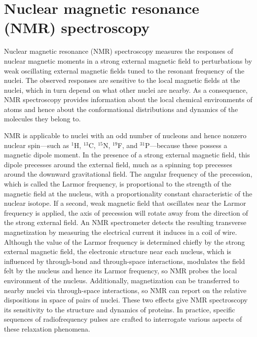 \documentclass[9pt,review,pubversion]{livecoms}
\begin{document}
\section{Nuclear magnetic resonance (NMR) spectroscopy}
\label{sec:nmr}

Nuclear magnetic resonance (NMR) spectroscopy measures the responses of nuclear magnetic moments in a strong external magnetic field to perturbations by weak oscillating external magnetic fields tuned to the resonant frequency of the nuclei.
The observed responses are sensitive to the local magnetic fields at the nuclei, which in turn depend on what other nuclei are nearby.
As a consequence, NMR spectroscopy provides information about the local chemical environments of atoms and hence about the conformational distributions and dynamics of the molecules they belong to.

NMR is applicable to nuclei with an odd number of nucleons and hence nonzero nuclear spin---such as $^1$H, $^{13}$C, $^{15}$N, $^{19}$F, and $^{31}$P---because these possess a magnetic dipole moment.
In the presence of a strong external magnetic field, this dipole precesses around the external field, much as a spinning top precesses around the downward gravitational field.
The angular frequency of the precession, which is called the Larmor frequency, is proportional to the strength of the magnetic field at the nucleus, with a proportionality constant characteristic of the nuclear isotope.
If a second, weak magnetic field that oscillates near the Larmor frequency is applied, the axis of precession will rotate away from the direction of the strong external field.
An NMR spectrometer detects the resulting transverse magnetization by measuring the electrical current it induces in a coil of wire.
Although the value of the Larmor frequency is determined chiefly by the strong external magnetic field, the electronic structure near each nucleus, which is influenced by through-bond and through-space interactions, modulates the field felt by the nucleus and hence its Larmor frequency, so NMR probes the local environment of the nucleus.
Additionally, magnetization can be transferred to nearby nuclei via through-space interactions, so NMR can report on the relative dispositions in space of pairs of nuclei.
These two effects give NMR spectroscopy its sensitivity to the structure and dynamics of proteins.
In practice, specific sequences of radiofrequency pulses are crafted to interrogate various aspects of these relaxation phenomena. 
\end{document}
